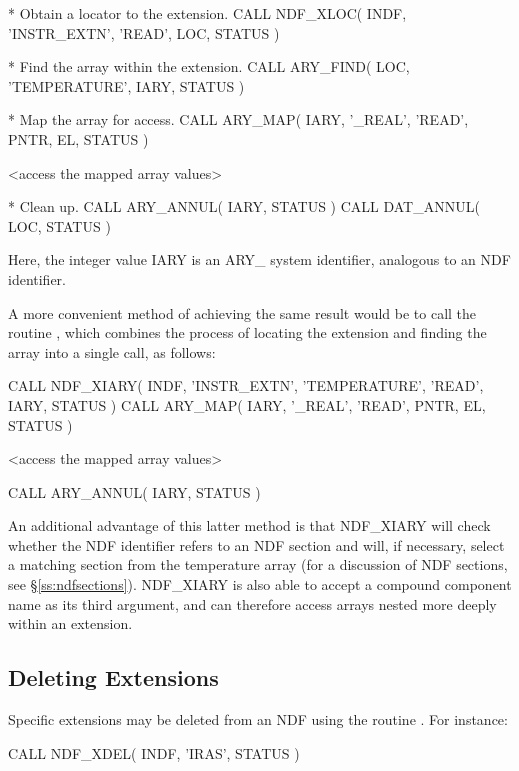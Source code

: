 \documentclass[twoside,11pt,nolof]{starlink}
\begin{document}
\small
\begin{terminalv}
*  Obtain a locator to the extension.
      CALL NDF_XLOC( INDF, 'INSTR_EXTN', 'READ', LOC, STATUS )

*  Find the array within the extension.
      CALL ARY_FIND( LOC, 'TEMPERATURE', IARY, STATUS )

*  Map the array for access.
      CALL ARY_MAP( IARY, '_REAL', 'READ', PNTR, EL, STATUS )

      <access the mapped array values>

*  Clean up.
      CALL ARY_ANNUL( IARY, STATUS )
      CALL DAT_ANNUL( LOC, STATUS )
\end{terminalv}
\normalsize

Here, the integer value IARY is an ARY\_ system identifier, analogous to an NDF
identifier.

A more convenient method of achieving the same result would be to call the
routine , which combines the process of locating the extension and
finding the array into a single call, as follows:

\small
\begin{terminalv}
      CALL NDF_XIARY( INDF, 'INSTR_EXTN', 'TEMPERATURE', 'READ', IARY, STATUS )
      CALL ARY_MAP( IARY, '_REAL', 'READ', PNTR, EL, STATUS )

      <access the mapped array values>

      CALL ARY_ANNUL( IARY, STATUS )
\end{terminalv}
\normalsize

An additional advantage of this latter method is that NDF\_XIARY will
check whether the NDF identifier refers to an NDF section and will, if
necessary, select a matching section from the temperature array (for a
discussion of NDF sections, see \S\ref{ss:ndfsections}). NDF\_XIARY is
also able to accept a compound  component name as
its third argument, and can therefore access arrays nested more deeply
within an extension.

\subsection{Deleting Extensions}

Specific extensions may be deleted from an NDF using the routine .
For instance:

\small
\begin{terminalv}
      CALL NDF_XDEL( INDF, 'IRAS', STATUS )
\end{terminalv}
\normalsize
\end{document}
